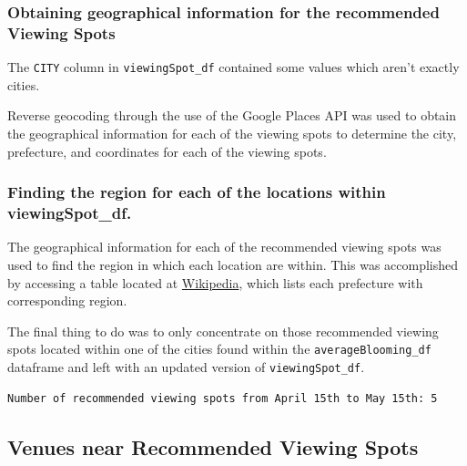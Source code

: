 \documentclass[11pt]{article}
\begin{document}
    \hypertarget{obtaining-geographical-information-for-the-recommended-viewing-spots}{%
\subsubsection{Obtaining geographical information for the recommended Viewing Spots}\label{obtaining-geographical-information-for-the-recommended-viewing-spots}}

The \texttt{CITY} column in \texttt{viewingSpot\_df} contained some values which aren't exactly cities.

Reverse geocoding through the use of the Google Places API was used to obtain the geographical information for
each of the viewing spots to determine the city, prefecture, and coordinates for each of the viewing spots.

    \hypertarget{finding-the-region-for-each-of-the-locations-within-viewingspot_df.}{%
\subsubsection{Finding the region for each of the locations within viewingSpot\_df.}\label{finding-the-region-for-each-of-the-locations-within-viewingspot_df}}

The geographical information for each of the recommended viewing spots was used to find the region in which each location are within. 
This was accomplished by accessing a table located at \href{https://simple.wikipedia.org/wiki/Prefectures_of_Japan}{Wikipedia},
which lists each prefecture with corresponding region.

The final thing to do was to only concentrate on those recommended viewing spots located within one of the cities found within the 
\texttt{averageBlooming\_df} dataframe and left with an updated version of \texttt{viewingSpot\_df}.



\begin{Verbatim}[commandchars=\\\{\}]
  Number of recommended viewing spots from April 15th to May 15th: 5
      \end{Verbatim}
  
    \hypertarget{Venues-near-recommended-viewing-spots}{%
\subsection{Venues near Recommended Viewing Spots}\label{Venues-near-recommended-viewing-spots}}
\end{document}
